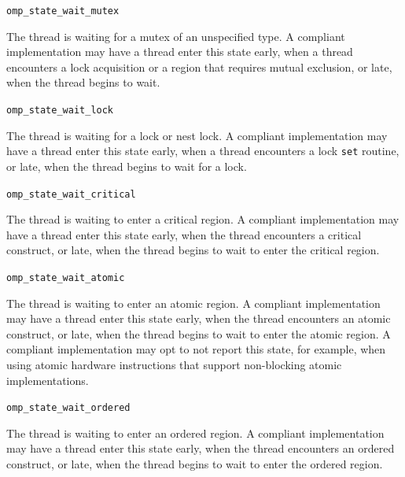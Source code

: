 \documentclass{article}
\newcommand{\descheader}[1]{{\needspace{3\baselineskip}\vspace{1em}\noindent \fbox{#1}}}
\begin{document}
\begin{description}

\item \verb|omp_state_wait_mutex|

  The thread is waiting for a mutex of an unspecified type. A compliant implementation
  may have a thread enter this state early, when a thread encounters a lock acquisition or a region that requires mutual exclusion, or late, when the thread begins to wait.

\item \verb|omp_state_wait_lock|

  The thread is waiting for a  lock  or nest lock. A compliant implementation
  may have a thread enter this state early, when a thread
  encounters a lock \verb|set| routine, or late, when the thread
  begins to wait for a lock.

\item \verb|omp_state_wait_critical| 

  The thread is waiting to enter a critical region. A compliant
  implementation may have a thread enter this state early, when the
  thread encounters a critical construct, or late, when the thread
  begins to wait to enter the critical region. 


\item \verb|omp_state_wait_atomic| 

  The thread is waiting to enter an atomic region. A compliant
  implementation may have a thread enter this state early, when the thread
  encounters an atomic construct, or late, when the thread begins
  to wait to enter the atomic region. 
  A compliant implementation may opt to not report
  this state, for example, when using atomic hardware instructions that support non-blocking atomic implementations.
  

\item \verb|omp_state_wait_ordered| 

  The thread is waiting to enter an ordered region. A compliant
  implementation may have a thread enter this state early, when the thread encounters
  an ordered construct, or late, when the thread begins
  to wait to enter the ordered region. 
  
\end{description}
  
\descheader{Target Wait States}
\end{document}

